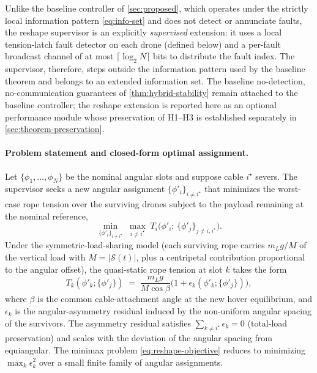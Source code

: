 Unlike the baseline controller of \cref{sec:proposed}, which operates under the strictly local information pattern \eqref{eq:info-set} and does not detect or annunciate faults, the reshape supervisor is an explicitly \emph{supervised} extension: it uses a local tension-latch fault detector on each drone (defined below) and a per-fault broadcast channel of at most $\lceil \log_2 N \rceil$ bits to distribute the fault index. The supervisor, therefore, steps outside the information pattern used by the baseline theorem and belongs to an extended information set. The baseline no-detection, no-communication guarantees of \cref{thm:hybrid-stability} remain attached to the baseline controller; the reshape extension is reported here as an optional performance module whose preservation of H1--H3 is established separately in \cref{sec:theorem-preservation}.

\paragraph{Problem statement and closed-form optimal assignment.} Let $\{\phi_1, \dots, \phi_N\}$ be the nominal angular slots and suppose cable $i^\star$ severs. The supervisor seeks a new angular assignment $\{\phi'_i\}_{i \ne i^\star}$ that minimizes the worst-case rope tension over the surviving drones subject to the payload remaining at the nominal reference,
\begin{equation}
  \min_{\{\phi'_i\}_{i\ne i^\star}}
  \;\max_{i \ne i^\star}\;
  T_i\bigl(\phi'_i;\, \{\phi'_j\}_{j \ne i, i^\star}\bigr).
  \label{eq:reshape-objective}
\end{equation}
Under the symmetric-load-sharing model (each surviving rope carries $m_L g / M$ of the vertical load with $M = |\mathcal{S}(t)|$, plus a centripetal contribution proportional to the angular offset), the quasi-static rope tension at slot $k$ takes the form
\begin{equation}
  T_k(\phi'_k; \{\phi'_j\})
    \;=\; \frac{m_L g}{M\cos\beta}
    \bigl(1 + \epsilon_k(\phi'_k; \{\phi'_j\})\bigr),
  \label{eq:tension-quasistatic}
\end{equation}
where $\beta$ is the common cable-attachment angle at the new hover equilibrium, and $\epsilon_k$ is the angular-asymmetry residual induced by the non-uniform angular spacing of the survivors. The asymmetry residual satisfies $\sum_{k \ne i^\star} \epsilon_k = 0$ (total-load preservation) and scales with the deviation of the angular spacing from equiangular. The minimax problem \eqref{eq:reshape-objective} reduces to minimizing $\max_k \epsilon_k^2$ over a small finite family of angular assignments.

